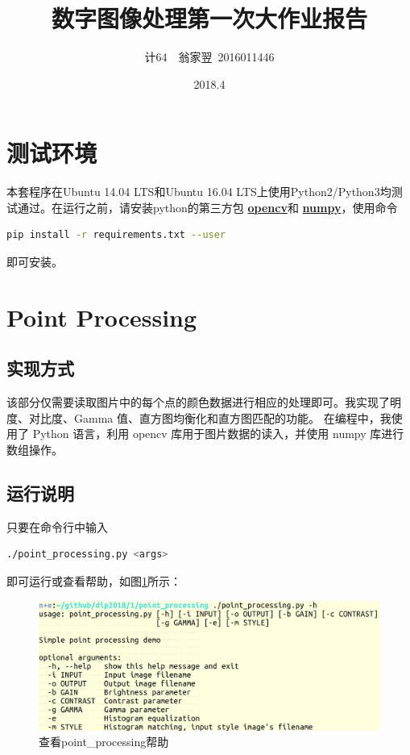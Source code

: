 \documentclass[a4paper]{article}
\title{\bf 数字图像处理第一次大作业报告}
\date{2018.4}
\author{计64~~翁家翌~2016011446}
\begin{document}
\kaishu
\ttfamily
\maketitle
\tableofcontents
\newpage
\section{测试环境}

本套程序在Ubuntu 14.04 LTS和Ubuntu 16.04 LTS上使用Python2/Python3均测试通过。在运行之前，请安装python的第三方包 \underline{\textbf{opencv}}和 \underline{\textbf{numpy}}，使用命令
\begin{lstlisting}[language=bash]
pip install -r requirements.txt --user
\end{lstlisting}
即可安装。

\section{Point Processing}

\subsection{实现方式}

该部分仅需要读取图片中的每个点的颜色数据进行相应的处理即可。我实现了明度、对比度、Gamma 值、直方图均衡化和直方图匹配的功能。
在编程中，我使用了 Python 语言，利用 opencv 库用于图片数据的读入，并使用 numpy 库进行数组操作。

\subsection{运行说明}
只要在命令行中输入 
\begin{lstlisting}[language=bash]
./point_processing.py <args>
\end{lstlisting}
即可运行或查看帮助，如图\ref{fig:1-1}所示：
\begin{figure}[htp]
\centering
\includegraphics[width=1\linewidth]{1_1.png}
\caption{查看point\_processing帮助}
\label{fig:1-1}
\end{figure}
\end{document}
